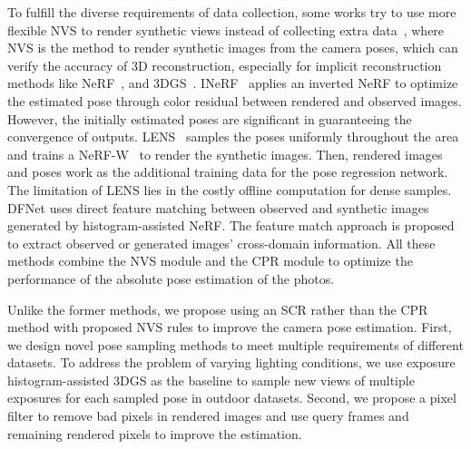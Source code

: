 To fulfill the diverse requirements of data collection, some works try to use more flexible NVS to render synthetic views instead of collecting extra data~\cite{chen2021direct,ng2021reassessing,purkait2018synthetic,taira2018inloc,moreau2022lens,chen2022dfnet}, where NVS is the method to render synthetic images from the camera poses, which can verify the accuracy of 3D reconstruction, especially for implicit reconstruction methods like NeRF~\cite{mildenhall2021NeRF}, and 3DGS~\cite{kerbl20233dgs}.
INeRF~\cite{yen2021iNeRF} applies an inverted NeRF to optimize the estimated pose through color residual between rendered and observed images. However, the initially estimated poses are significant in guaranteeing the convergence of outputs.
LENS~\cite{moreau2022lens} samples the poses uniformly throughout the area and trains a NeRF-W~\cite{nerfw} to render the synthetic images. Then, rendered images and poses work as the additional training data for the pose regression network. The limitation of LENS lies in the costly offline computation for dense samples. DFNet uses direct feature matching between observed and synthetic images generated by histogram-assisted NeRF. The feature match approach is proposed to extract observed or generated images' cross-domain information. All these methods combine the NVS module and the CPR module to optimize the performance of the absolute pose estimation of the photos.

Unlike the former methods, we propose using an SCR rather than the CPR method with proposed NVS rules to improve the camera pose estimation.
First, we design novel pose sampling methods to meet multiple requirements of different datasets. To address the problem of varying lighting conditions, we use exposure histogram-assisted 3DGS as the baseline to sample new views of multiple exposures for each sampled pose in outdoor datasets.
Second, we propose a pixel filter to remove bad pixels in rendered images and use query frames and remaining rendered pixels to improve the estimation.

